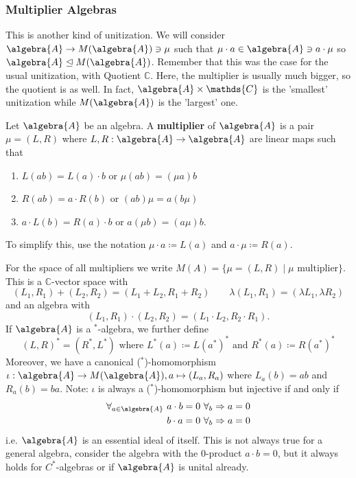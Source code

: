 \documentclass[a4paper]{article}
\begin{document}
\subsubsection*{Multiplier Algebras}

This is another kind of unitization.
We will consider $\algebra{A} \to M(\algebra{A}) \ni \mu$ such that $\mu \cdot a \in \algebra{A} \ni a \cdot \mu$ so $\algebra{A} \trianglelefteq M(\algebra{A})$.
Remember that this was the case for the usual unitization, with Quotient $\mathds{C}$.
Here, the multiplier is usually much bigger, so the quotient is as well.
In fact, $\algebra{A} \times \mathds{C}$ is the 'smallest' unitization while $M(\algebra{A})$ is the 'largest' one.

\begin{definition}
	Let $\algebra{A}$ be an algebra.
	A \textbf{multiplier} of $\algebra{A}$ is a pair $\mu = (L, R)$ where $L,R: \algebra{A} \to \algebra{A}$ are linear maps such that 
	\begin{enumerate}
		\item $L(ab) = L(a) \cdot b$ or $\mu (ab) = (\mu a) b$
		\item $R(ab) = a \cdot R(b)$ or $ (ab) \mu = a (b \mu)$
		\item $a \cdot L(b) = R(a) \cdot b$ or $a (\mu b) = (a \mu) b$.
	\end{enumerate}
	To simplify this, use the notation $\mu \cdot a \coloneq L(a)$ and $a \cdot \mu \coloneq R(a)$.
\end{definition}

For the space of all multipliers we write $M(A) = \{ \mu = (L,R) \mid \mu \text{ multiplier} \}$. This is a $\mathds{C}$-vector space with
\begin{equation*}
	(L_1, R_1) + (L_2, R_2) = (L_1 + L_2, R_1 + R_2) \qquad \lambda (L_1, R_1) = (\lambda L_1, \lambda R_2)
\end{equation*}
and an algebra with 
\begin{equation*}
	(L_1, R_1) \cdot (L_2, R_2) = (L_1 \cdot L_2, R_2 \cdot R_1)\text{.}
\end{equation*}
If $\algebra{A}$ is a $^*$-algebra, we further define
\begin{equation*}
	(L,R)^* = (R^*, L^*) \text{ where } L^*(a) \coloneq L(a^*)^* \text{ and } R^*(a) \coloneq R(a^*)^*
\end{equation*}
Moreover, we have a canonical ($^*$)-homomorphism $\iota: \algebra{A} \to M(\algebra{A}), a \mapsto (L_a, R_a)$ where $L_a(b) = ab $ and $R_a(b) = ba$.
Note: $\iota$ is always a ($^*$)-homomorphism but injective if and only if 
\begin{align*}
	\forall_{a \in \algebra{A}} \ & a \cdot b = 0 \ \forall_b \then a = 0 \\ 
	&b \cdot a = 0 \ \forall_b \then a = 0
\end{align*}
i.e. $\algebra{A}$ is an essential ideal of itself. This is not always true for a general algebra, consider the algebra with the $0$-product $a \cdot b = 0$, but it always holds for $C^*$-algebras or if $\algebra{A}$ is unital already.
\end{document}

